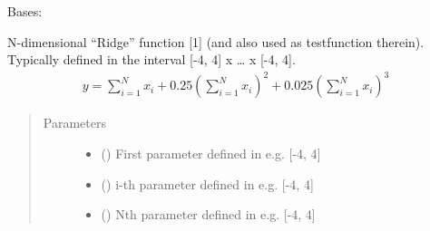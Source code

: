 \documentclass[letterpaper,10pt,english,openany,oneside]{sphinxmanual}
\begin{document}
\begin{fulllineitems}
\label{\detokenize{pygpc.testfunctions:pygpc.testfunctions.testfunctions.Ridge}}
Bases: {\hyperref[\detokenize{pygpc:pygpc.AbstractModel.AbstractModel}]{}}

N-dimensional “Ridge” function {[}1{]} (and also used as testfunction therein).
Typically defined in the interval {[}-4, 4{]} x … x {[}-4, 4{]}.
\begin{equation*}
\begin{split}y = \sum_{i=1}^{N}x_i + 0.25 \left( \sum_{i=1}^{N}x_i \right)^2 + 0.025 \left( \sum_{i=1}^{N}x_i \right)^3\end{split}
\end{equation*}\begin{quote}\begin{description}
\item[{Parameters}] \leavevmode\begin{itemize}
\item {} 
\sphinxstyleliteralstrong{\sphinxupquote{{[}}}\sphinxstyleliteralstrong{\sphinxupquote{{]}}} (\sphinxstyleliteralemphasis{\sphinxupquote{ {[}}}\sphinxstyleliteralemphasis{\sphinxupquote{{]}}}) \textendash{} First parameter defined in e.g. {[}-4, 4{]}

\item {} 
\sphinxstyleliteralstrong{\sphinxupquote{{[}}}\sphinxstyleliteralstrong{\sphinxupquote{{]}}} (\sphinxstyleliteralemphasis{\sphinxupquote{ {[}}}\sphinxstyleliteralemphasis{\sphinxupquote{{]}}}) \textendash{} i-th parameter defined in e.g. {[}-4, 4{]}

\item {} 
\sphinxstyleliteralstrong{\sphinxupquote{{[}}}\sphinxstyleliteralstrong{\sphinxupquote{{]}}} (\sphinxstyleliteralemphasis{\sphinxupquote{ {[}}}\sphinxstyleliteralemphasis{\sphinxupquote{{]}}}) \textendash{} Nth parameter defined in e.g. {[}-4, 4{]}


\end{itemize}
\end{description}
\end{quote}
\end{fulllineitems}
\end{document}
